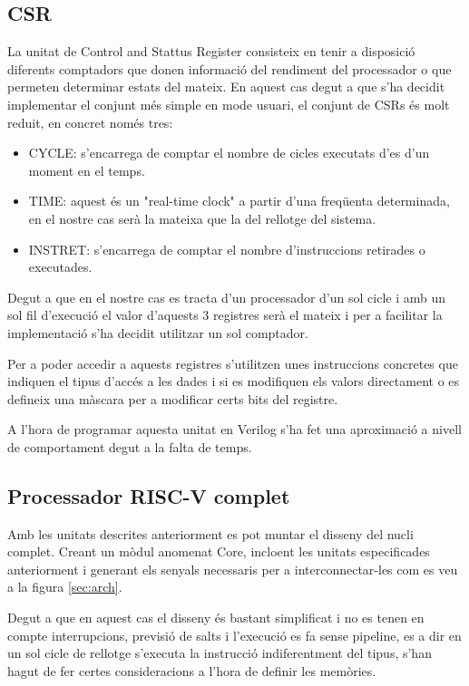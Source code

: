 \documentclass[10pt,a4paper,twocolumn,twoside]{article}
\begin{document}
    
    \subsection{CSR}
    La unitat de Control and Stattus Register consisteix en tenir a disposició diferents comptadors que donen informació del rendiment del processador o que permeten determinar estats del mateix. 
    En aquest cas degut a que s'ha decidit implementar el conjunt més simple en mode usuari, el conjunt de CSRs és molt reduit, en concret només tres: 
    \begin{itemize}
        \item CYCLE: s'encarrega de comptar el nombre de cicles executats d'es d'un moment en el temps.
        \item TIME: aquest és un "real-time clock" a partir d'una freqüenta determinada, en el nostre cas serà la mateixa que la del rellotge del sistema.
        \item INSTRET: s'encarrega de comptar el nombre d'instruccions retirades o executades.
    \end{itemize}
    
    Degut a que en el nostre cas es tracta d'un processador d'un sol cicle i amb un sol fil d'execució el valor d'aquests 3 registres serà el mateix i per a facilitar la implementació s'ha decidit utilitzar un sol comptador.
    
    Per a poder accedir a aquests registres s'utilitzen unes instruccions concretes que indiquen el tipus d'accés a les dades i si es modifiquen els valors directament o es defineix una màscara per a modificar certs bits del registre.
    
    A l'hora de programar aquesta unitat en Verilog s'ha fet una aproximació a nivell de comportament degut a la falta de temps.
    

    
    \subsection{Processador RISC-V complet}
    
    Amb les unitats descrites anteriorment es pot muntar el disseny del nucli complet. Creant un mòdul anomenat Core, incloent les unitats especificades anteriorment i generant els senyals necessaris per a interconnectar-les com es veu a la figura \ref{sec:arch}.
    
    Degut a que en aquest cas el disseny és bastant simplificat i no es tenen en compte interrupcions, previsió de salts i l'execució es fa sense pipeline, es a dir en un sol cicle de rellotge s'executa la instrucció indiferentment del tipus, s'han hagut de fer certes consideracions a l'hora de definir les memòries.
    
\end{document}
